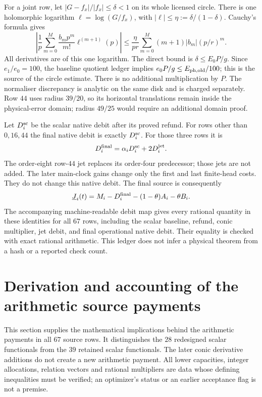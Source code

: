 \documentclass[11pt,a4paper]{article}
\theoremstyle{definition}
\theoremstyle{remark}
\begin{document}
For a joint row, let $|G-f_x|/|f_x|\le\delta<1$ on its whole
licensed circle. There is one holomorphic logarithm
$\ell=\log(G/f_x)$, with $|\ell|\le\eta:=\delta/(1-\delta)$.
Cauchy's formula gives
\[
 \left|\frac1p\sum_{m=0}^M\frac{b_mp^m}{m!}
           \ell^{(m+1)}(p)\right|
 \le\frac\eta{pr}\sum_{m=0}^M(m+1)|b_m|(p/r)^m.
\]
All derivatives are of this one logarithm. The direct bound is
$\delta\le E_0P/g$. Since $e_1/e_0=100$, the baseline quotient
ledger implies $e_0P/g\le E_{\rm ph,old}/100$; this is the source
of the circle estimate. There is no additional multiplication by $P$.
The normaliser discrepancy is analytic on the same disk and is charged
separately. Row $44$ uses radius $39/20$, so its horizontal translations
remain inside the physical-error domain; radius $49/25$ would require
an additional domain proof.

Let $D_i^{\rm sc}$ be the scalar native debit after its proved refund.
For rows other than $0,16,44$ the final native debit is exactly
$D_i^{\rm sc}$. For those three rows it is
\[
 D_i^{\rm final}=\alpha_iD_i^{\rm sc}+2D_i^{\rm jet}.
\]
The order-eight row-$44$ jet replaces its order-four predecessor; those
jets are not added. The later main-clock gains change only the first
and last finite-head costs. They do not change this native debit.
The final source is consequently
\[
 \underline J_i(t)=M_i-D_i^{\rm final}
                  -(1-\theta)A_i-\theta B_i.
\]
The accompanying machine-readable debit map gives every rational
quantity in these identities for all $67$ rows, including the scalar
baseline, refund, conic multiplier, jet debit, and final operational
native debit. Their equality is checked with exact rational arithmetic.
This ledger does not infer a physical theorem from a hash or a reported
check count.


\clearpage
\section{Derivation and accounting of the arithmetic source payments}
\label{sec:arithmetic-credit-audit}

This section supplies the mathematical implications behind the arithmetic
payments in all $67$ source rows. It distinguishes the $28$ redesigned
scalar functionals from the $39$ retained scalar functionals. The later
conic derivative additions do not create a new arithmetic payment.
All lower capacities, integer allocations, relation vectors and rational
multipliers are data whose defining inequalities must be verified; an
optimizer's status or an earlier acceptance flag is not a premise.
\end{document}
